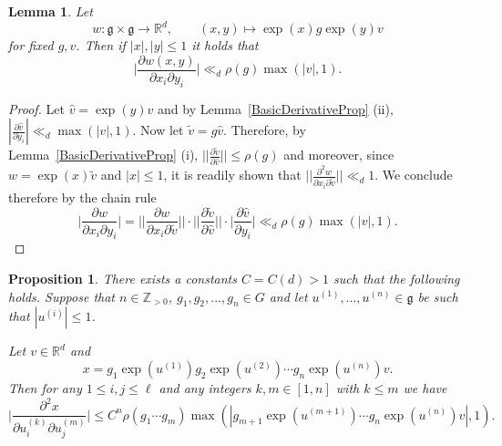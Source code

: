 \documentclass[10pt, english,oneside,reqno]{amsart}
\theoremstyle{plain}
\newtheorem{proposition}[theorem]{Proposition}
\newtheorem{lemma}[theorem]{Lemma}
\theoremstyle{remark}
\numberwithin{equation}{section}
\numberwithin{figure}{section}
\newcommand{\Z}{\mathbb{Z}}
\newcommand{\R}{\mathbb{R}}
\begin{document}
 
\begin{lemma}\label{wSecondDerivative}
    Let $$w : \mathfrak{g} \times \mathfrak{g} \longrightarrow \R^d, \quad\quad (x,y) \longmapsto \exp(x)g\exp(y)v $$ for fixed $g,v$. Then if $|x|, |y| \leq 1$ it holds that $$\bigg|\frac{\partial w(x,y)}{\partial x_i \partial y_i}\bigg| \ll_d \rho(g)\max(|v|,1).$$
\end{lemma}

\begin{proof}
    Let $\hat{v} = \exp(y)v$ and by Lemma~\ref{BasicDerivativeProp} (ii), $| \frac{\partial \hat{v}}{\partial y_i} | \ll_d \max(|v|,1).$ Now let $\tilde{v}= g\hat{v}$. Therefore, by Lemma~\ref{BasicDerivativeProp} (i), $||\frac{\partial \tilde{v}}{\partial\hat{v}}|| \leq \rho(g)$ and moreover, since $w = \exp(x)\tilde{v}$ and $|x| \leq 1$, it is readily shown that $||\frac{\partial^2 w}{\partial x_i \partial \tilde{v}}|| \ll_d 1$. We conclude therefore by the chain rule
    $$\bigg|\frac{\partial w}{\partial x_i \partial y_i}\bigg| = \bigg|\bigg|\frac{\partial w}{\partial x_i \partial \tilde{v}}\bigg|\bigg|\cdot \bigg|\bigg|\frac{\partial \tilde{v}}{\partial\hat{v}}\bigg|\bigg| \cdot \bigg| \frac{\partial \hat{v}}{\partial y_i} \bigg| \ll_d \rho(g)\max(|v|,1).$$
\end{proof}

\begin{proposition}\label{DerivativeBound}
      There exists a constants $C = C(d) > 1$ such that the following holds. Suppose that $n \in \Z_{>0}$, $g_1, g_2, \ldots , g_n \in G$ and let $u^{(1)}, \ldots , u^{(n)} \in \mathfrak{g}$ be such that $|u^{(i)}| \leq 1$.

      Let $v\in \R^d$ and $$x = g_1 \exp(u^{(1)})g_2\exp(u^{(2)}) \cdots g_n \exp(u^{(n)})v.$$ Then for any $1 \leq i,j \leq \ell$ and any integers $k,m \in [1,n]$ with $k\leq m$ we have $$\bigg|\frac{\partial^2x}{\partial u_i^{(k)} \partial u_j^{(m)}} \bigg| \leq C^n\rho(g_1\cdots g_{m})\max(|g_{m + 1}\exp(u^{(m + 1)}) \cdots g_{n}\exp(u^{(n)}) v|,1).$$
\end{proposition}
\end{document}
